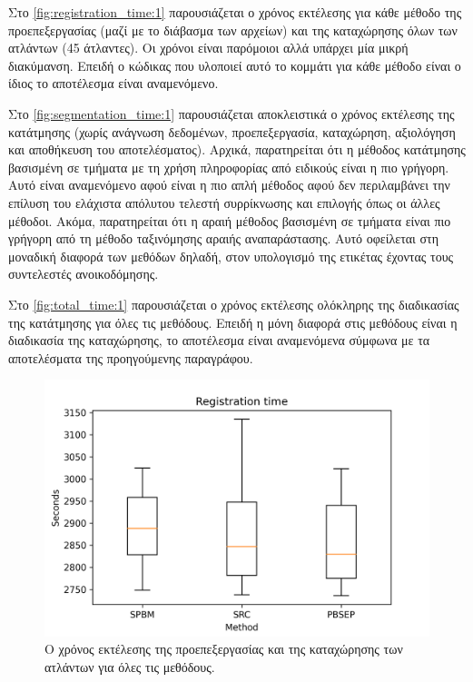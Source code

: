 \documentclass[a4paper,12pt]{article}
\begin{document}
Στο \autoref{fig:registration_time:1} παρουσιάζεται ο χρόνος εκτέλεσης για κάθε
μέθοδο της προεπεξεργασίας (μαζί με το διάβασμα των αρχείων) και της καταχώρησης
όλων των ατλάντων (45 άτλαντες). Οι χρόνοι είναι παρόμοιοι αλλά υπάρχει μία
μικρή διακύμανση. Επειδή ο κώδικας που υλοποιεί αυτό το κομμάτι για κάθε μέθοδο
είναι ο ίδιος το αποτέλεσμα είναι αναμενόμενο.

Στο \autoref{fig:segmentation_time:1} παρουσιάζεται αποκλειστικά ο χρόνος
εκτέλεσης της κατάτμησης (χωρίς ανάγνωση δεδομένων, προεπεξεργασία, καταχώρηση,
αξιολόγηση και αποθήκευση του αποτελέσματος). Αρχικά, παρατηρείται ότι η μέθοδος
κατάτμησης βασισμένη σε τμήματα με τη χρήση πληροφορίας από ειδικούς είναι η πιο
γρήγορη. Αυτό είναι αναμενόμενο αφού είναι η πιο απλή μέθοδος αφού δεν
περιλαμβάνει την επίλυση του ελάχιστα απόλυτου τελεστή συρρίκνωσης και επιλογής
όπως οι άλλες μέθοδοι. Ακόμα, παρατηρείται ότι η αραιή μέθοδος βασισμένη σε
τμήματα είναι πιο γρήγορη από τη μέθοδο ταξινόμησης αραιής αναπαράστασης. Αυτό
οφείλεται στη μοναδική διαφορά των μεθόδων δηλαδή, στον υπολογισμό της ετικέτας
έχοντας τους συντελεστές ανοικοδόμησης.

Στο \autoref{fig:total_time:1} παρουσιάζεται ο χρόνος εκτέλεσης ολόκληρης της
διαδικασίας της κατάτμησης για όλες τις μεθόδους. Επειδή η μόνη διαφορά στις
μεθόδους είναι η διαδικασία της καταχώρησης, το αποτέλεσμα είναι αναμενόμενα
σύμφωνα με τα αποτελέσματα της προηγούμενης παραγράφου.


\begin{figure}[H]
    \centering
    \includegraphics[width=0.85\linewidth]{Registration_time_plot.png}
    \caption{Ο χρόνος εκτέλεσης της προεπεξεργασίας και της καταχώρησης των
             ατλάντων για όλες τις μεθόδους.}
    \label{fig:registration_time:1}
\end{figure}
\end{document}
